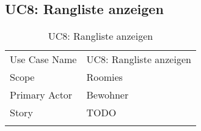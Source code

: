 \subsection{UC8: Rangliste anzeigen}
\begin{table}[H]
	\tablestyle
	\tablealtcolored
	\begin{tabularx}{\textwidth}{lX}
		\tablebody
			Use Case Name &
			UC8: Rangliste anzeigen
			\tabularnewline
			Scope &
			Roomies
			\tabularnewline
			Primary Actor &
			Bewohner
			\tabularnewline
			Story &
			TODO
			\tabularnewline
		\tableend
	\end{tabularx}
	\caption{UC8: Rangliste anzeigen}
\end{table}


